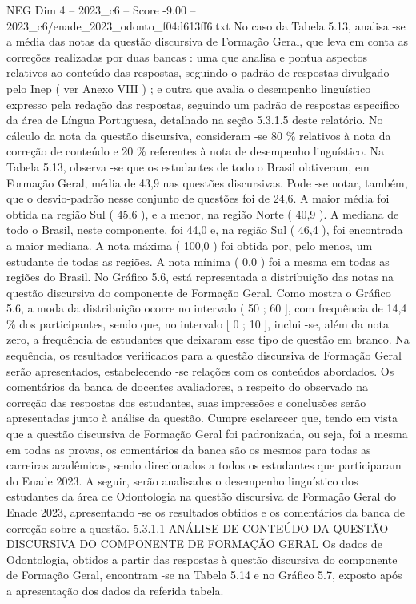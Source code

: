 \begin{textsample}{NEG Dim 4 – 2023\_c6 – Score -9.00 – 2023\_c6/enade\_2023\_odonto\_f04d613ff6.txt}
No caso da Tabela 5.13, analisa -se a média das notas da questão discursiva de Formação Geral, que leva em conta as correções realizadas por duas bancas : uma que analisa e pontua aspectos relativos ao conteúdo das respostas, seguindo o padrão de respostas divulgado pelo Inep ( ver Anexo VIII ) ; e outra que avalia o desempenho linguístico expresso pela redação das respostas, seguindo um padrão de respostas específico da área de Língua Portuguesa, detalhado na seção 5.3.1.5 deste relatório.
No cálculo da nota da questão discursiva, consideram -se 80 \% relativos à nota da correção de conteúdo e 20 \% referentes à nota de desempenho linguístico.
Na Tabela 5.13, observa -se que os estudantes de todo o Brasil obtiveram, em Formação Geral, média de 43,9 nas questões discursivas.
Pode -se notar, também, que o desvio-padrão nesse conjunto de questões foi de 24,6.
A maior média foi obtida na região Sul ( 45,6 ), e a menor, na região Norte ( 40,9 ).
A mediana de todo o Brasil, neste componente, foi 44,0 e, na região Sul ( 46,4 ), foi encontrada a maior mediana.
A nota máxima ( 100,0 ) foi obtida por, pelo menos, um estudante de todas as regiões.
A nota mínima ( 0,0 ) foi a mesma em todas as regiões do Brasil.
No Gráfico 5.6, está representada a distribuição das notas na questão discursiva do componente de Formação Geral.
Como mostra o Gráfico 5.6, a moda da distribuição ocorre no intervalo ( 50 ; 60 ], com frequência de 14,4 \% dos participantes, sendo que, no intervalo [ 0 ; 10 ], inclui -se, além da nota zero, a frequência de estudantes que deixaram esse tipo de questão em branco.
Na sequência, os resultados verificados para a questão discursiva de Formação Geral serão apresentados, estabelecendo -se relações com os conteúdos abordados.
Os comentários da banca de docentes avaliadores, a respeito do observado na correção das respostas dos estudantes, suas impressões e conclusões serão apresentadas junto à análise da questão.
Cumpre esclarecer que, tendo em vista que a questão discursiva de Formação Geral foi padronizada, ou seja, foi a mesma em todas as provas, os comentários da banca são os mesmos para todas as carreiras acadêmicas, sendo direcionados a todos os estudantes que participaram do Enade 2023.
A seguir, serão analisados o desempenho linguístico dos estudantes da área de Odontologia na questão discursiva de Formação Geral do Enade 2023, apresentando -se os resultados obtidos e os comentários da banca de correção sobre a questão. 5.3.1.1 ANÁLISE DE CONTEÚDO DA QUESTÃO DISCURSIVA DO COMPONENTE DE FORMAÇÃO GERAL Os dados de Odontologia, obtidos a partir das respostas à questão discursiva do componente de Formação Geral, encontram -se na Tabela 5.14 e no Gráfico 5.7, exposto após a apresentação dos dados da referida tabela.

\end{textsample}
